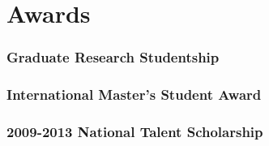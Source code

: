 \documentclass[]{deedy-resume-openfont}
\begin{document}
\begin{minipage}[t]{0.33\textwidth}
\sectionsep


\section{Awards} 
\subsubsection*{Graduate Research Studentship}
\subsubsection*{International Master's Student Award}

\subsubsection*{2009-2013 National Talent Scholarship}

\sectionsep
%
%

\end{minipage} 
\hfill
\end{document}
